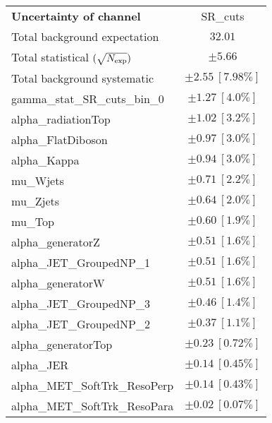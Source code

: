 
\begin{table}
\begin{center}
\setlength{\tabcolsep}{0.0pc}
\begin{tabular*}{\textwidth}{@{\extracolsep{\fill}}lc}
\noalign{\smallskip}\hline\noalign{\smallskip}
{\bf Uncertainty of channel}                                    & SR\_cuts            \\
\noalign{\smallskip}\hline\noalign{\smallskip}
Total background expectation             &  $32.01$       \\
\noalign{\smallskip}\hline\noalign{\smallskip}
Total statistical $(\sqrt{N_{\rm exp}})$              & $\pm 5.66$       \\
Total background systematic               & $\pm 2.55\ [7.98\%] $             \\
\noalign{\smallskip}\hline\noalign{\smallskip}
\noalign{\smallskip}\hline\noalign{\smallskip}
gamma\_stat\_SR\_cuts\_bin\_0         & $\pm 1.27\ [4.0\%] $       \\
alpha\_radiationTop         & $\pm 1.02\ [3.2\%] $       \\
alpha\_FlatDiboson         & $\pm 0.97\ [3.0\%] $       \\
alpha\_Kappa         & $\pm 0.94\ [3.0\%] $       \\
mu\_Wjets         & $\pm 0.71\ [2.2\%] $       \\
mu\_Zjets         & $\pm 0.64\ [2.0\%] $       \\
mu\_Top         & $\pm 0.60\ [1.9\%] $       \\
alpha\_generatorZ         & $\pm 0.51\ [1.6\%] $       \\
alpha\_JET\_GroupedNP\_1         & $\pm 0.51\ [1.6\%] $       \\
alpha\_generatorW         & $\pm 0.51\ [1.6\%] $       \\
alpha\_JET\_GroupedNP\_3         & $\pm 0.46\ [1.4\%] $       \\
alpha\_JET\_GroupedNP\_2         & $\pm 0.37\ [1.1\%] $       \\
alpha\_generatorTop         & $\pm 0.23\ [0.72\%] $       \\
alpha\_JER         & $\pm 0.14\ [0.45\%] $       \\
alpha\_MET\_SoftTrk\_ResoPerp         & $\pm 0.14\ [0.43\%] $       \\
alpha\_MET\_SoftTrk\_ResoPara         & $\pm 0.02\ [0.07\%] $       \\

\end{tabular*}
\end{center}
\end{table}
